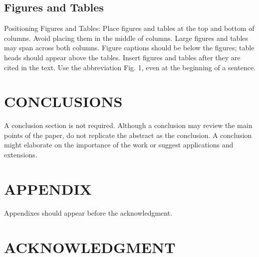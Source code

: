 \documentclass[letterpaper, 10 pt, conference]{ieeeconf}  %
\begin{document}
\subsection{Figures and Tables}

Positioning Figures and Tables: Place figures and tables at the top and bottom of columns. Avoid placing them in the middle of columns. Large figures and tables may span across both columns. Figure captions should be below the figures; table heads should appear above the tables. Insert figures and tables after they are cited in the text. Use the abbreviation Fig. 1, even at the beginning of a sentence.


\section{CONCLUSIONS}

A conclusion section is not required. Although a conclusion may review the main points of the paper, do not replicate the abstract as the conclusion. A conclusion might elaborate on the importance of the work or suggest applications and extensions. 

\addtolength{\textheight}{-12cm}   %







\section*{APPENDIX}

Appendixes should appear before the acknowledgment.

\section*{ACKNOWLEDGMENT}
\end{document}
